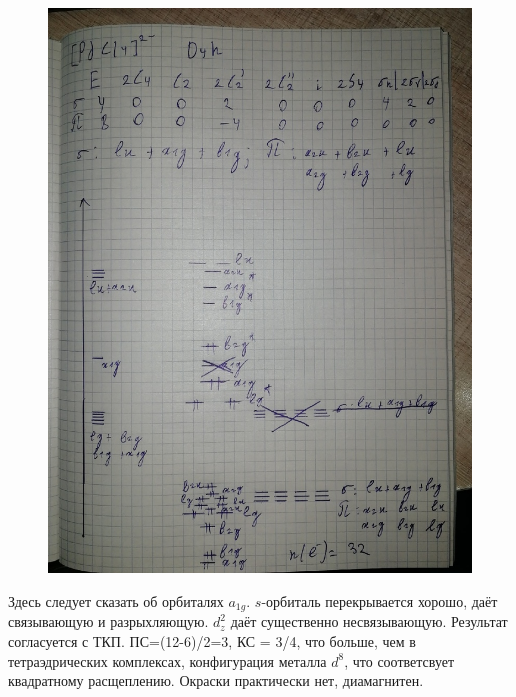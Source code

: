 \begin{figure}[H]
\centering
\includegraphics[scale=.300]{images/halogenides4.jpg}
\end{figure}

Здесь следует сказать об орбиталях $a_{1g}$. $s$-орбиталь перекрывается хорошо, даёт связывающую и разрыхляющую. $d_z^2$ даёт существенно несвязывающую. Результат согласуется с ТКП. ПС=(12-6)/2=3, КС = 3/4, что больше, чем в тетраэдрических комплексах, конфигурация металла $d^8$, что соответсвует квадратному расщеплению. Окраски практически нет, диамагнитен.



